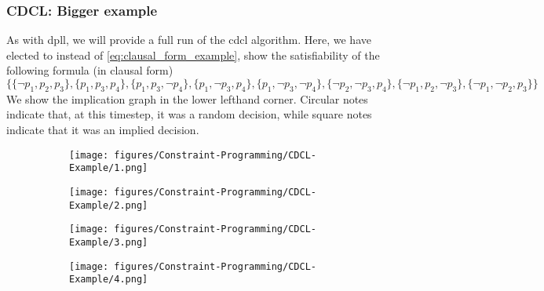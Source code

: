 \subsubsection{CDCL: Bigger example}\label{sec:CDCL_BIG_examp}
As with \acrshort{dpll}, we will provide a full run of the \acrshort{cdcl} algorithm. Here, we have elected to instead of \autoref{eq:clausal_form_example}, show the satisfiability of the following formula (in clausal form)
\begin{equation}\label{eq:SAT_example2}
    \Big\{
        \{
            \neg p_1, p_2, p_3
        \},
        \{
            p_1, p_3, p_4
        \},
        \{
            p_1, p_3, \neg p_4
        \},
        \{
            p_1, \neg p_3, p_4
        \},
        \{
            p_1, \neg p_3, \neg p_4
        \},
        \{
            \neg p_2, \neg p_3, p_4
        \},
        \{
            \neg p_1, p_2, \neg p_3
        \},
        \{
            \neg p_1, \neg p_2, p_3
        \}
    \Big\}
\end{equation}
We show the implication graph in the lower lefthand corner. Circular notes indicate that, at this timestep, it was a random decision, while square notes indicate that it was an implied decision.
\begin{figure}[H]
    \centering
    \begin{subfigure}[t]{0.48\textwidth}
        \centering
        \texttt{[image: figures/Constraint-Programming/CDCL-Example/1.png]}
    \end{subfigure}
    \hfill
    \begin{subfigure}[t]{0.48\textwidth}
        \centering
        \texttt{[image: figures/Constraint-Programming/CDCL-Example/2.png]}
    \end{subfigure}
\end{figure}

\begin{figure}[H]
    \centering
    \begin{subfigure}[t]{0.48\textwidth}
        \centering
        \texttt{[image: figures/Constraint-Programming/CDCL-Example/3.png]}
    \end{subfigure}
    \hfill
    \begin{subfigure}[t]{0.48\textwidth}
        \centering
        \texttt{[image: figures/Constraint-Programming/CDCL-Example/4.png]}
    \end{subfigure}
\end{figure}

